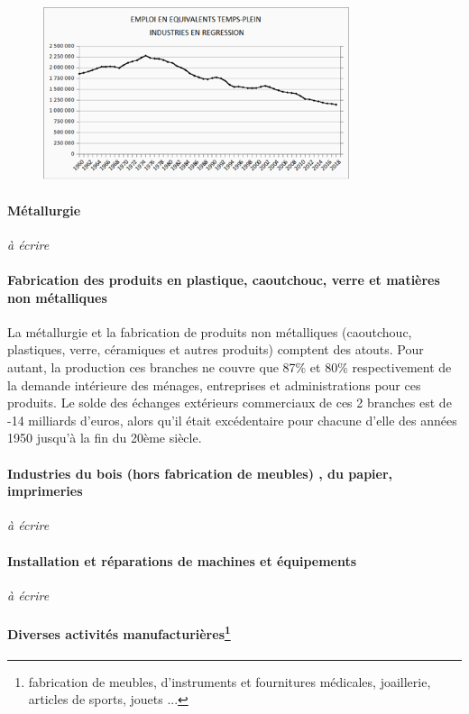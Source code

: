 \documentclass[a4paper]{article}
\begin{document}
\begin{figure}[H]
    \centering
    \includegraphics*[width=0.8\textwidth]{images/etp3}
    \label{fig:etp3}
\end{figure}

\paragraph{Métallurgie}
\textit{à écrire}

\paragraph{Fabrication des produits en plastique, caoutchouc, verre et matières non métalliques}
La métallurgie et la fabrication de produits non métalliques (caoutchouc, plastiques, verre, céramiques et autres produits) comptent des atouts. Pour autant, la production ces branches ne couvre que 87\% et 80\% respectivement de la demande intérieure des ménages, entreprises et administrations pour ces produits. Le solde des échanges extérieurs commerciaux de ces 2 branches est de -14 milliards d'euros, alors qu’il était excédentaire pour chacune d’elle des années 1950 jusqu’à la fin du 20ème siècle.

\paragraph{Industries du bois (hors fabrication de meubles) , du papier, imprimeries}
\textit{à écrire}

\paragraph{Installation et réparations de machines et équipements}
\textit{à écrire}

\paragraph{Diverses activités manufacturières\protect\footnote{fabrication de meubles, d’instruments et fournitures médicales, joaillerie, articles de sports, jouets ...}}
\end{document}
